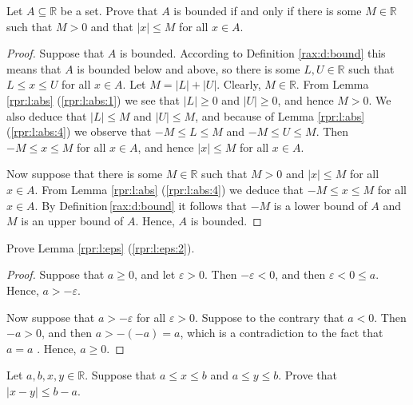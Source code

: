 \addtocounter{exercise}{1}
\Newpage
\begin{exercise} %
	Let $A \subseteq \mathbb{R}$ be a set. Prove that $A$ is bounded if and only if there is some $M \in \mathbb{R}$ such that $M > 0$ and that $|x| \leq M$ for all $x \in A$.
\end{exercise}

\begin{proof}
	Suppose that $A$ is bounded. According to Definition \ref{rax:d:bound} this means that $A$ is bounded below and above, so there is some $L, U \in \mathbb{R}$ such that $L \leq x \leq U$ for all $x \in A$. Let $M = |L| + |U|$. Clearly, $M \in \mathbb{R}$. From Lemma \ref{rpr:l:abs} (\ref{rpr:l:abs:1}) we see that $|L| \geq 0$ and $|U| \geq 0$, and hence $M > 0$. We also deduce that $|L| \leq M$ and $|U| \leq M$, and because of Lemma \ref{rpr:l:abs} (\ref{rpr:l:abs:4}) we observe that $-M \leq L \leq M$ and $-M \leq U \leq M$. Then $-M \leq x \leq M$ for all $x \in A$, and hence $|x| \leq M$ for all $x \in A$.

	Now suppose that there is some $M \in \mathbb{R}$ such that $M > 0$ and $|x| \leq M$ for all $x \in A$. From Lemma \ref{rpr:l:abs} (\ref{rpr:l:abs:4}) we deduce that $-M \leq x \leq M$ for all $x \in A$. By Definition\,\ref{rax:d:bound} it follows that $-M$ is a lower bound of $A$ and $M$ is an upper bound of $A$. Hence, $A$ is bounded.
\end{proof}


\Newpage
\begin{exercise} %
	Prove Lemma \ref{rpr:l:eps} (\ref{rpr:l:eps:2}).
\end{exercise}

\begin{proof}
	Suppose that $a \geq 0$, and let $\varepsilon > 0$. Then $-\varepsilon < 0$, and then $\varepsilon < 0 \leq a$. Hence, $a > -\varepsilon$.

	Now suppose that $a > -\varepsilon$ for all $\varepsilon > 0$. Suppose to the contrary that $a < 0$. Then $-a > 0$, and then $a > -(-a) = a$, which is a contradiction to the fact that $a = a$ . Hence, $a \geq 0$.
\end{proof}


\Newpage
\begin{exercise} %
	Let $a, b, x, y \in \mathbb{R}$. Suppose that $a \leq x \leq b$ and $a \leq y \leq b$. Prove that $|x - y| \leq b - a$.
\end{exercise}

